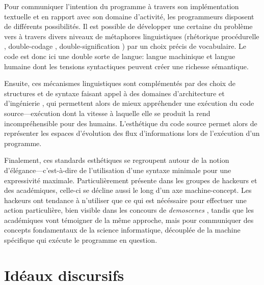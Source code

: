 \documentclass{article}
\begin{document}
Pour communiquer l'intention du programme à travers son implémentation textuelle et en rapport avec son domaine d'activité, les programmeurs disposent de différents possibilités. Il est possible de développer une certaine du problème vers à travers divers niveaux de métaphores linguistiques (rhétorique procédurelle \citep{bogost_rhetoric_2008}, double-codage \citep{cox_speaking_2013}, double-signification \citep{paloque-berges_poetique_2009}) par un choix précis de vocabulaire. Le code est donc ici une double sorte de langue: langue machinique et langue humaine dont les tensions syntactiques peuvent créer une richesse sémantique.

Ensuite, ces mécanismes linguistiques sont complémentés par des choix de structures et de syntaxe faisant appel à des domaines d'architecture et d'ingénierie \citep{gabriel_patterns_1998,schummer_aesthetic_2009}, qui permettent alors de mieux appréhender une exécution du code source—exécution dont la vitesse à laquelle elle se produit la rend incompréhensible pour des humains. L'esthétique du code source permet alors de représenter les espaces d'évolution des flux d'informations lors de l'exécution d'un programme.

Finalement, ces standards esthétiques se regroupent autour de la notion d'élégance—c'est-à-dire de l'utilisation d'une syntaxe minimale pour une expressivité maximale. Particulièrement présente dans les groupes de hackeurs et des académiques, celle-ci se décline aussi le long d'un axe machine-concept. Les hackeurs ont tendance à n'utiliser que ce qui est nécéssaire pour effectuer une action particulière, bien visible dans les concours de \emph{demoscenes} \citep{kudra_aoc_2020}, tandis que les académiques vont témoigner de la même approche, mais pour communiquer des concepts fondamentaux de la science informatique, découplée de la machine spécifique qui exécute le programme en question.

\section*{Idéaux discursifs}
\end{document}
